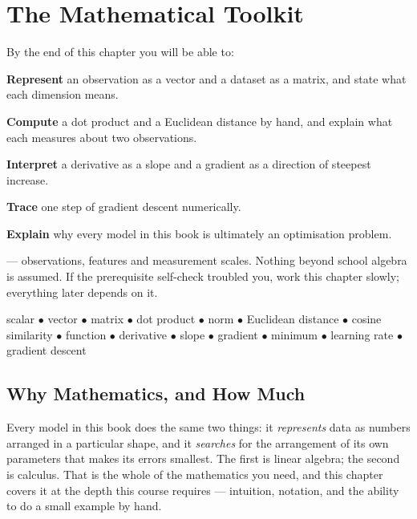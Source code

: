 \chapter{The Mathematical Toolkit}\label{ch:math}

\begin{outcomes}
By the end of this chapter you will be able to:
\begin{tight}
  \item \textbf{Represent} an observation as a vector and a dataset as a matrix, and state what each dimension means.
  \item \textbf{Compute} a dot product and a Euclidean distance by hand, and explain what each measures about two observations.
  \item \textbf{Interpret} a derivative as a slope and a gradient as a direction of steepest increase.
  \item \textbf{Trace} one step of gradient descent numerically.
  \item \textbf{Explain} why every model in this book is ultimately an optimisation problem.
\end{tight}
\end{outcomes}

\begin{prereq}
 --- observations, features and measurement scales. Nothing beyond
school algebra is assumed. If the prerequisite self-check troubled you, work this
chapter slowly; everything later depends on it.
\end{prereq}

\begin{keyterms}
scalar $\bullet$ vector $\bullet$ matrix $\bullet$ dot product $\bullet$ norm
$\bullet$ Euclidean distance $\bullet$ cosine similarity $\bullet$ function
$\bullet$ derivative $\bullet$ slope $\bullet$ gradient $\bullet$ minimum
$\bullet$ learning rate $\bullet$ gradient descent
\end{keyterms}

\section{Why Mathematics, and How Much}

Every model in this book does the same two things: it \emph{represents} data as
numbers arranged in a particular shape, and it \emph{searches} for the arrangement
of its own parameters that makes its errors smallest. The first is linear algebra;
the second is calculus. That is the whole of the mathematics you need, and this
chapter covers it at the depth this course requires --- intuition, notation, and
the ability to do a small example by hand.

